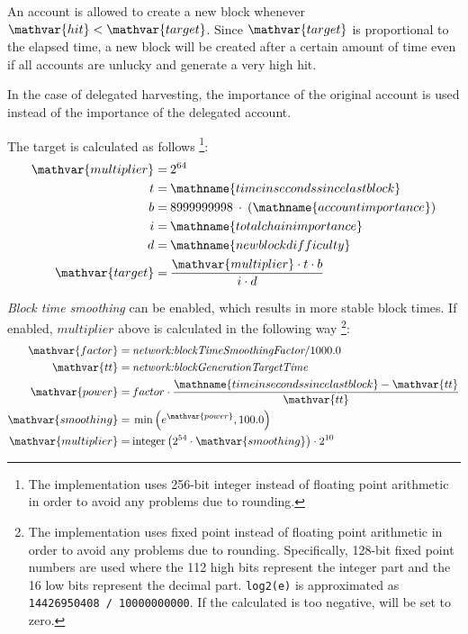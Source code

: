 An account is allowed to create a new block whenever $\mathvar{hit} < \mathvar{target}$.
Since $\mathvar{target}$ is proportional to the elapsed time, a new block will be created after a certain amount of time even if all accounts are unlucky and generate a very high hit.

In the case of delegated harvesting, the importance of the original account is used instead of the importance of the delegated account.

The target is calculated as follows
\footnote{The implementation uses 256-bit integer instead of floating point arithmetic in order to avoid any problems due to rounding.}:
\begin{align*}
	\mathvar{multiplier} = \: & 2^{64} \\
	t = \: & \mathname{time in seconds since last block} \\
	b = \: & 8999999998 \: \cdot \: (\mathname{account importance}) \\
	i = \: & \mathname{total chain importance} \\
	d = \: & \mathname{new block difficulty} \\
	\mathvar{target} = \: & \frac{\mathvar{multiplier} \cdot t \cdot b}{i \cdot d}
\end{align*}

\emph{Block time smoothing} can be enabled, which results in more stable block times.
If enabled, $multiplier$ above is calculated in the following way
\footnote{
	The implementation uses fixed point instead of floating point arithmetic in order to avoid any problems due to rounding.
	Specifically, 128-bit fixed point numbers are used where the 112 high bits represent the integer part and the 16 low bits represent the decimal part.
	\texttt{log2(e)} is approximated as \texttt{14426950408 / 10000000000}.
	If the calculated  is too negative,  will be set to zero.
}:
\begin{align*}
	\mathvar{factor} = \: & \nemsetting{network}{blockTimeSmoothingFactor} / 1000.0 \\
	\mathvar{tt} = \: & \nemsetting{network}{blockGenerationTargetTime} \\
	\mathvar{power} = \: & factor \cdot \frac{\mathname{time in seconds since last block} - \mathvar{tt}}{\mathvar{tt}} \\
	\mathvar{smoothing} = \: & \min\left(e^{\mathvar{power}}, 100.0\right) \\
	\mathvar{multiplier} = \: & \mathfunc{integer}\left(2^{54} \cdot \mathvar{smoothing}\right) \cdot 2^{10}
\end{align*}

